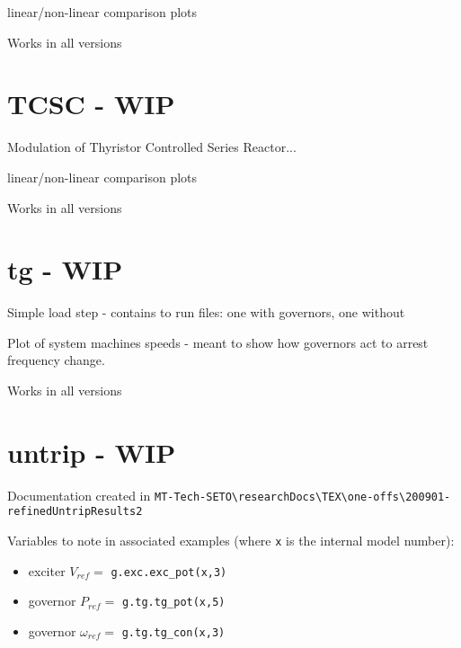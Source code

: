 linear/non-linear comparison plots

Works in all versions

\section{TCSC - WIP}
Modulation of Thyristor Controlled Series Reactor...

linear/non-linear comparison plots

Works in all versions

\section{tg - WIP}
Simple load step - contains to run files: one with governors, one without

Plot of system machines speeds - meant to show how governors act to arrest frequency change.

Works in all versions


\section{untrip - WIP}
Documentation created in \verb|MT-Tech-SETO\researchDocs\TEX\one-offs\200901-refinedUntripResults2|

Variables to note in associated examples (where \verb|x| is the internal model number):
\begin{itemize}
\item exciter $V_{ref} = $ \verb|g.exc.exc_pot(x,3)|
\item governor $P_{ref} = $ \verb|g.tg.tg_pot(x,5)|
\item governor $\omega_{ref} = $ \verb|g.tg.tg_con(x,3)|
\end{itemize}